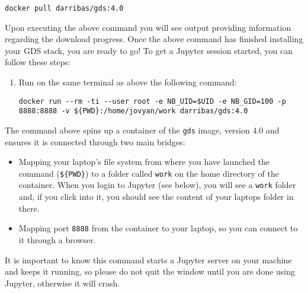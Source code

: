 \documentclass[
]{book}
\providecommand{\tightlist}{%
  \setlength{\itemsep}{0pt}\setlength{\parskip}{0pt}}
\begin{document}
\begin{verbatim}
docker pull darribas/gds:4.0
\end{verbatim}

Upon executing the above command you will see output providing information regarding the download progress.
Once the above command has finished installing your GDS stack, you are ready to go!
To get a Jupyter session started, you can follow these steps:

\begin{enumerate}
\def\labelenumi{\arabic{enumi}.}
\item
  Run on the same terminal as above the following command:

\begin{verbatim}
docker run --rm -ti --user root -e NB_UID=$UID -e NB_GID=100 -p 8888:8888 -v ${PWD}:/home/jovyan/work darribas/gds:4.0
\end{verbatim}
\end{enumerate}

The command above spins up a container of the \texttt{gds} image, version 4.0 and
ensures it is connected through two main bridges:

\begin{itemize}
\tightlist
\item
  Mapping your laptop's file system from where you have launched the
  command (\texttt{\$\{PWD\}}) to a folder called \texttt{work} on the home directory of
  the container. When you login to Jupyter (see below), you will see a
  \texttt{work} folder and, if you click into it, you should see the content of
  your laptops folder in there.
\item
  Mapping port \texttt{8888} from the container to your laptop, so you can
  connect to it through a browser.
\end{itemize}

It is important to know this command starts a Jupyter server on your machine and keeps it running, so please do not quit the window until you are
done using Jupyter, otherwise it will crash.
\end{document}
